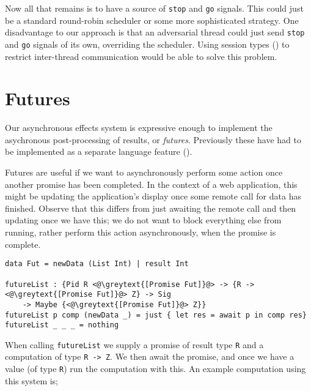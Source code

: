 \documentclass[msc,deptreport,cs]{infthesis} %
\newcommand{\code}[1]{\lstinline{#1}}
\newcommand{\greytext}[1]{\textcolor{black!40}{#1}}
\begin{document}


Now all that remains is to have a source of \code{stop} and \code{go} signals.
This could just be a standard round-robin scheduler or some more sophisticated
strategy. One disadvantage to our approach is that an adversarial thread could
just send \code{stop} and \code{go} signals of its own, overriding the
scheduler. Using session types (\cite{honda1998language}) to restrict
inter-thread communication would be able to solve this problem.

\section{Futures}
\label{sec:futures}

Our asynchronous effects system is expressive enough to implement the
asychronous post-processing of results, or \emph{futures}. Previously these have
had to be implemented as a separate language feature
(\cite{schwinghammer2002concurrent}).

Futures are useful if we want to asynchronously perform some action once another
promise has been completed. In the context of a web application, this might be
updating the application's display once some remote call for data has finished.
Observe that this differs from just awaiting the remote call and then updating
once we have this; we do not want to block everything else from running, rather
perform this action asynchronously, when the promise is complete.

\begin{lstlisting}
data Fut = newData (List Int) | result Int

futureList : {Pid R <@\greytext{[Promise Fut]}@> -> {R -> <@\greytext{[Promise Fut]}@> Z} -> Sig
    -> Maybe {<@\greytext{[Promise Fut]}@> Z}}
futureList p comp (newData _) = just { let res = await p in comp res}
futureList _ _ _ = nothing
\end{lstlisting}

\noindent When calling \code{futureList} we supply a promise of result type
\code{R} and a computation of type \code{R -> Z}. We then await the promise, and
once we have a value (of type \code{R}) run the computation with this. An
example computation using this system is;
\end{document}

